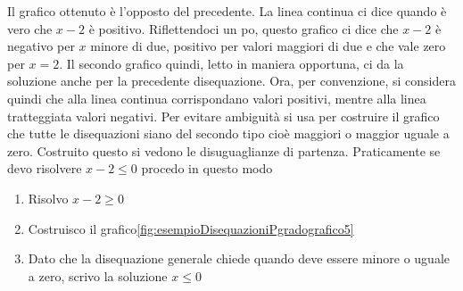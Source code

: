 Il grafico ottenuto è l'opposto del precedente. La linea continua ci dice quando è vero che $x-2$ è positivo. Riflettendoci un po, questo grafico ci dice che $x-2$ è negativo per $x$ minore di due, positivo per valori maggiori di due e che vale zero per $x=2$. Il secondo grafico quindi, letto in maniera opportuna, ci da la soluzione anche per la precedente disequazione. Ora, per convenzione, si considera quindi che alla linea continua corrispondano valori positivi, mentre alla linea tratteggiata  valori negativi. Per evitare ambiguità  si usa per costruire il grafico che tutte le disequazioni siano del secondo tipo cioè maggiori o maggior uguale a zero. Costruito questo si vedono le disuguaglianze di partenza. Praticamente se devo risolvere $x-2\leq 0$ procedo in questo modo
\begin{enumerate}
	\item Risolvo  $x-2\geq 0$
	\item Costruisco il grafico\nobs\vref{fig:esempioDisequazioniPgradografico5}
	\item Dato che la disequazione generale chiede quando deve essere minore o uguale a zero, scrivo la soluzione $x\leq 0$
\end{enumerate}
  
